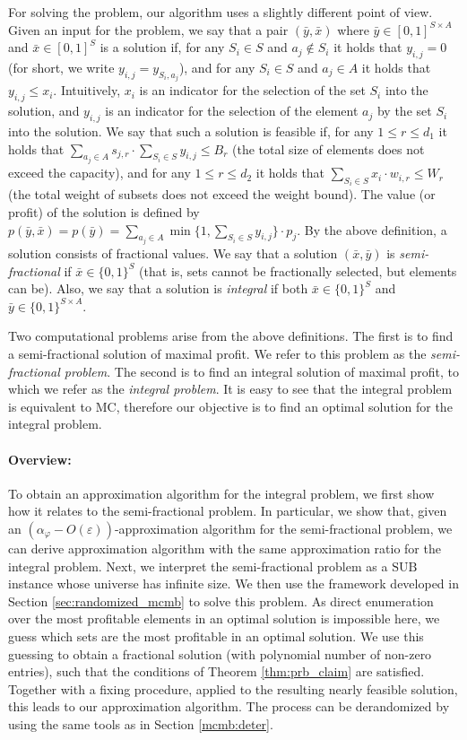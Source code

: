 \documentclass[11pt]{article}
\newcommand{\eps}{\varepsilon}
\newcommand{\bx}{\bar{x}}
\newcommand{\by}{\bar{y}}
\newcommand{\bS}{S}
\newcommand{\SUB}{\mbox{SUB}}
\newcommand{\MC}{\mbox{MC}}
\newcommand{\alphaf}{\alpha_\varphi}
\begin{document}
{{For solving the problem, our algorithm uses a slightly different point of view.
Given an input for the problem, we say that a pair $(\by,\bx)$ where $\by \in  [0,1]^{ \bS \times A}$ and $\bx \in  [0,1]^\bS$ } is a solution
if, for any $S_i \in \bS$ and $a_j \notin S_i$ it holds that $y_{i,j}=0$ (for short, we write $y_{i,j}=y_{S_i,a_j}$), and for any $S_i \in \bS$
and $a_j \in A$ it holds that $y_{i,j} \leq x_i$. Intuitively, $x_i$ is an indicator for the selection of the set $S_i$ into the solution, and
$y_{i,j}$ is an indicator for the selection of the element $a_j$ by the set $S_i$ into the solution. We say that such a solution is feasible if,
for any  $1\leq r \leq d_1$ it holds that $\sum_{a_j \in A} s_{j,r} \cdot \sum_{S_i \in \bS} y_{i,j}  \leq B_r$ (the total size of elements does
not exceed the capacity), and for any $1\leq r \leq d_2$ it holds that $\sum_{S_i \in \bS} x_i \cdot w_{i,r} \leq W_r$ (the total weight of
subsets does not exceed the weight bound).
The value (or profit)  of the solution  is defined by $p(\by,\bx)= p(\by) = \sum_{a_j \in A}  \min
\{1, \sum_{S_i \in \bS} y_{i,j} \} \cdot p_j$. By the above definition, a solution consists of fractional values. We say that a solution
$(\bx,\by)$ is \emph{semi-fractional}
if $\bx \in \{0,1\}^{\bS}$
(that is, sets cannot be fractionally selected, but elements can be). Also,
we say that a solution is \emph{integral} if both $\bx \in \{0,1\}^{\bS}$
and $\by \in \{0,1\}^{ \bS \times A}$.

Two computational problems arise from the above definitions. The first
is to find a semi-fractional solution of maximal profit. We refer to this
problem as the {\em semi-fractional problem}. The second
is to find an integral solution of maximal profit, to which we refer as
the {\em integral problem}. It is easy to see that the integral problem is
equivalent to $\MC$, therefore our objective is to find an optimal solution
for the integral problem.

\paragraph{Overview:} To obtain an approximation algorithm for the integral problem,
we first show how it relates to the semi-fractional problem. In particular, we show
that, given an $(\alphaf-O(\eps))$-approximation algorithm for the
semi-fractional problem, we can derive approximation algorithm with
the same approximation ratio for the integral problem.
Next, we interpret the semi-fractional problem as a $\SUB$ instance
whose universe has infinite size.
We then use the framework developed in Section \ref{sec:randomized_mcmb}
to solve this problem. As direct enumeration over the most
profitable elements in an optimal solution is impossible here, we
guess which sets are the most profitable in an optimal solution.
We use this guessing to obtain a fractional solution (with
polynomial number of non-zero entries), such that the conditions of
Theorem \ref{thm:prb_claim} are satisfied. Together with a fixing procedure,
applied to the resulting nearly feasible solution, this leads to our
approximation algorithm. The process can be derandomized by using the
same tools as in Section \ref{mcmb:deter}.

}
\end{document}
